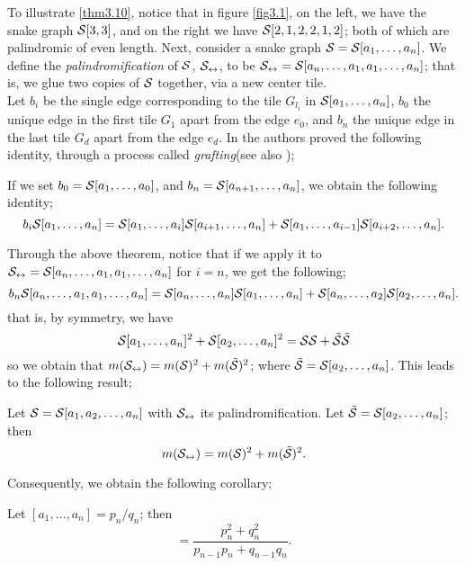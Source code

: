 To illustrate \ref{thm3.10}, notice that in figure \ref{fig3.1}, on the left, we have the snake graph $\mathcal{S}[3,3]$, and on the right we have $\mathcal{S}[2,1,2,2,1,2]$; both of which are palindromic of even length. Next, consider a snake graph $\mathcal{S}=\mathcal{S}[a_1,\dots,a_n]$. We define the \emph{palindromification} of $\mathcal{S}$, $\mathcal{S}_{\leftrightarrow}$, to be $\mathcal{S}_{\leftrightarrow} = \mathcal{S}[a_n,\dots,a_1,a_1,\dots,a_n]$; that is, we glue two copies of $\mathcal{S}$ together, via a new center tile. 
\\

Let $b_i$ be the single edge corresponding to the tile $G_{l_i}$ in $\mathcal{S}[a_1,\dots,a_n]$, $b_0$ the unique edge in the first tile $G_1$ apart from the edge $e_0$, and $b_n$ the unique edge in the last tile $G_d$ apart from the edge $e_d$. In \cite{CS2} the authors proved the following identity, through a process called \emph{grafting}(see also \cite{CS3});
\begin{theorem}\label{thm3.11}
    If we set $b_0 = \mathcal{S}[a_1,\dots,a_0]$, and $b_n = \mathcal{S}[a_{n+1},\dots,a_n]$, we obtain the following identity;
\begin{equation*}
    b_i\mathcal{S}[a_1,\dots,a_n] = \mathcal{S}[a_1,\dots,a_i]\mathcal{S}[a_{i+1},\dots,a_n]+\mathcal{S}[a_1,\dots,a_{i-1}]\mathcal{S}[a_{i+2},\dots,a_n].
\end{equation*}
\end{theorem}
Through the above theorem, notice that if we apply it to $\mathcal{S}_{\leftrightarrow} = \mathcal{S}[a_n,\dots,a_1,a_1,\dots,a_n]$ for $i=n$, we get the following;
\begin{equation*}
    b_n\mathcal{S}[a_n,\dots,a_1,a_1,\dots,a_n] = \mathcal{S}[a_n,\dots,a_n]\mathcal{S}[a_1,\dots,a_n]+\mathcal{S}[a_n,\dots,a_2]\mathcal{S}[a_2,\dots,a_n].
\end{equation*}
that is, by symmetry, we have 
\begin{equation}
    \mathcal{S}[a_1,\dots,a_n]^2 + \mathcal{S}[a_2,\dots,a_n]^2 = \mathcal{S}\mathcal{S} + \Tilde{\mathcal{S}}\Tilde{\mathcal{S}}
\end{equation}
so we obtain that $m(\mathcal{S}_{\leftrightarrow}) = m(\mathcal{S})^2 + m(\Tilde{\mathcal{S}})^2$; where $\Tilde{\mathcal{S}} = \mathcal{S}[a_2,\dots,a_n]$. This leads to the following result;
\begin{theorem}\label{thm3.12}
    Let $\mathcal{S} = \mathcal{S}[a_1,a_2,\dots,a_n]$ with $\mathcal{S}_{\leftrightarrow}$ its palindromification. Let $\Tilde{\mathcal{S}} = \mathcal{S}[a_2,\dots,a_n]$; then
    \begin{equation*}
        m(\mathcal{S}_{\leftrightarrow}) = m(\mathcal{S})^2 + m(\Tilde{\mathcal{S}})^2.
    \end{equation*}
\end{theorem}
Consequently, we obtain the following corollary;
\begin{corollary}
    Let $[a_1,\dots,a_n] = p_n/q_n$; then
    \begin{equation*}
        [a_n,\dots,a_1,a_1,\dots,a_n] = \dfrac{p_n^2 + q_n^2}{p_{n-1}p_n + q_{n-1}q_n}.
    \end{equation*}
\end{corollary}
